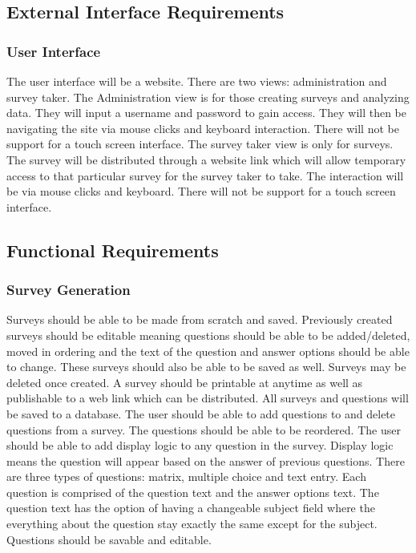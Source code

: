 \documentclass[letterpaper,10pt,titlepage, draftclsnofoot,onecolumn]{IEEEtran}
\begin{document}
\subsection{External Interface Requirements}
\subsubsection{User Interface}
The user interface will be a website. There are two views: administration and survey taker. 
The Administration view is for those creating surveys and analyzing data. They will input a 
username and password to gain access. They will then be navigating the site via mouse clicks 
and keyboard interaction. There will not be support for a touch screen interface. The survey
taker view is only for surveys. The survey will be distributed through a website link which 
will allow temporary access to that particular survey for the survey taker to take. The 
interaction will be via mouse clicks and keyboard. There will not be support for a touch screen
interface.

\subsection{Functional Requirements}

\subsubsection{Survey Generation}
Surveys should be able to be made from scratch and saved. Previously created surveys should be editable 
meaning questions should be able to be added/deleted, moved in ordering and the text of the question 
and answer options should be able to change. These surveys should also be able to be saved as well. 
Surveys may be deleted once created. A survey should be printable at anytime as well as publishable to a
web link which can be distributed. All surveys and questions will be saved to a database.
The user should be able to add questions to and delete questions from a survey. The questions should be able to
be reordered. The user should be able to add display logic to any question in the survey. Display logic means the
question will appear based on the answer of previous questions.
There are three types of questions: matrix, multiple choice and text entry. Each question is comprised of the 
question text and the answer options text. The question text has the option of having a changeable subject
field where the everything about the question stay exactly the same except for the subject. Questions should
be savable and editable. \\
\end{document}
